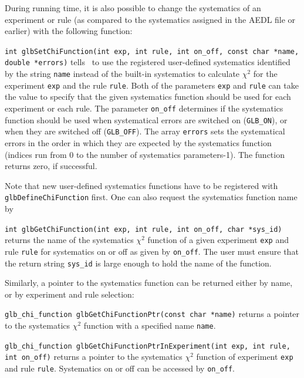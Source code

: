 During running time, it is also possible to change the systematics of an experiment or
rule (as compared to the systematics assigned in the AEDL file or earlier) with the following function:
\begin{function}
{\tt int glbSetChiFunction(int exp, int rule, int on\_off, const char *name, double *errors)}
 tells \GLOBES\ to use the registered user-defined systematics identified by the string {\tt name}
instead of the built-in systematics
to calculate $\chi^2$ for the experiment {\tt exp} and the rule {\tt rule}. 
Both of the parameters {\tt exp} and {\tt rule} can take the value  to specify that the
given systematics function should be used for each experiment or each rule. The parameter 
{\tt on\_off} determines if the systematics function should be used when systematical errors
are switched on ({\tt GLB\_ON}), or when they are switched off ({\tt GLB\_OFF}).
The array {\tt errors} sets the systematical errors in the order in which they
are expected by the systematics function (indices run from $0$ to
the number of systematics parameters-1). The function returns zero, if successful.
\end{function}
Note that new user-defined systematics functions have to be registered with {\tt glbDefineChiFunction} first. 
One can also request the systematics function name by 
\begin{function}
{\tt int glbGetChiFunction(int exp, int rule, int on\_off, char *sys\_id)}
returns the name of the systematics $\chi^2$ function of a given experiment {\tt exp} and rule {\tt rule} for
systematics on or off as given by {\tt on\_off}. The user must 
ensure that the return string {\tt sys\_id} is large enough to hold the name of the function.
\end{function}
Similarly, a pointer to the systematics function can be returned either by name, or by experiment and rule selection:
\begin{function}
{\tt glb\_chi\_function glbGetChiFunctionPtr(const char *name)}
returns a pointer to the systematics $\chi^2$ function with a specified name {\tt name}.
\end{function}
\begin{function}
{\tt glb\_chi\_function glbGetChiFunctionPtrInExperiment(int exp, int rule, int on\_off)}
returns a pointer to the systematics $\chi^2$ function of experiment {\tt exp} and rule {\tt rule}.
Systematics on or off can be accessed by {\tt on\_off}.
\end{function}


